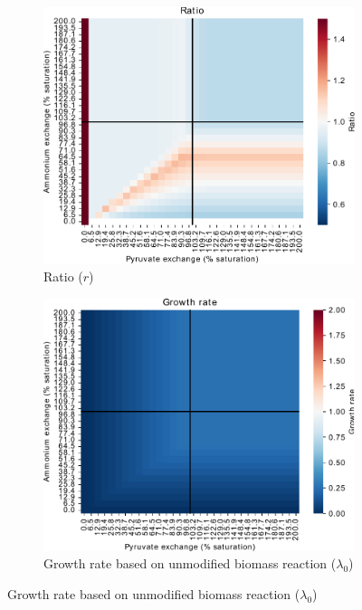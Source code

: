 \begin{figure}
  \centering
  \begin{subfigure}[t]{0.45\textwidth}
  \centering
    \includegraphics[width=\linewidth]{ec_grid_pyr_amm_ratio}
    \caption{
      Ratio ($r$)
    }
    \label{fig:model-grid-pyr-ratio}
  \end{subfigure}%
  \begin{subfigure}[t]{0.45\textwidth}
  \centering
    \includegraphics[width=\linewidth]{ec_grid_pyr_amm_growthrate}
    \caption{
      Growth rate based on unmodified biomass reaction ($\lambda_{0}$)
}
\end{subfigure}
\end{figure}
